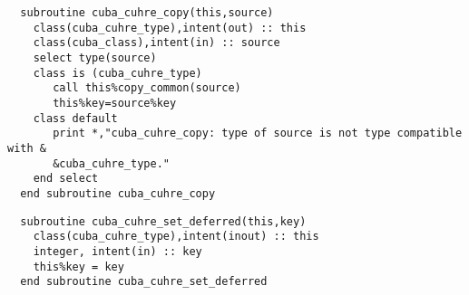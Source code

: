 \begin{Verbatim}
  subroutine cuba_cuhre_copy(this,source)
    class(cuba_cuhre_type),intent(out) :: this
    class(cuba_class),intent(in) :: source
    select type(source)
    class is (cuba_cuhre_type)
       call this%copy_common(source)
       this%key=source%key
    class default
       print *,"cuba_cuhre_copy: type of source is not type compatible with &
       &cuba_cuhre_type."
    end select
  end subroutine cuba_cuhre_copy
\end{Verbatim}

\begin{Verbatim}
  subroutine cuba_cuhre_set_deferred(this,key)
    class(cuba_cuhre_type),intent(inout) :: this  
    integer, intent(in) :: key
    this%key = key
  end subroutine cuba_cuhre_set_deferred
\end{Verbatim}

